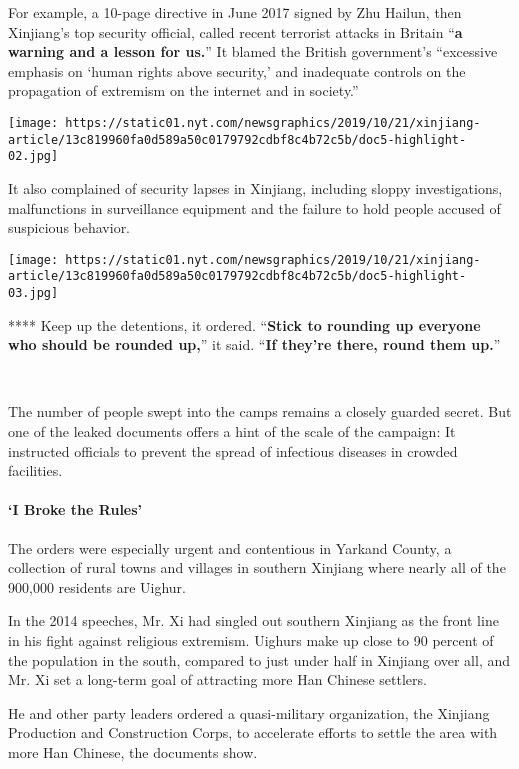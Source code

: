 For example, a 10-page directive in June 2017 signed by Zhu Hailun, then
Xinjiang's top security official, called recent terrorist attacks in
Britain ``\textbf{a warning and a lesson for us.}'' It blamed the
British government's ``excessive emphasis on `human rights above
security,' and inadequate controls on the propagation of extremism on
the internet and in society.''

\texttt{[image: https://static01.nyt.com/newsgraphics/2019/10/21/xinjiang-article/13c819960fa0d589a50c0179792cdbf8c4b72c5b/doc5-highlight-02.jpg]}

It also complained of security lapses in Xinjiang, including sloppy
investigations, malfunctions in surveillance equipment and the failure
to hold people accused of suspicious behavior.

\texttt{[image: https://static01.nyt.com/newsgraphics/2019/10/21/xinjiang-article/13c819960fa0d589a50c0179792cdbf8c4b72c5b/doc5-highlight-03.jpg]}

 **** Keep up the detentions, it ordered. ``\textbf{Stick to rounding up
everyone who should be rounded up,}'' it said. ``\textbf{If they're
there, round them up.}''

​

The number of people swept into the camps remains a closely guarded
secret. But one of the leaked documents offers a hint of the scale of
the campaign: It instructed officials to prevent the spread of
infectious diseases in crowded facilities.

\hypertarget{-i-broke-the-rules-}{%
\paragraph{ `I Broke the Rules' }\label{-i-broke-the-rules-}}

The orders were especially urgent and contentious in Yarkand County, a
collection of rural towns and villages in southern Xinjiang where nearly
all of the 900,000 residents are Uighur.

In the 2014 speeches, Mr. Xi had singled out southern Xinjiang as the
front line in his fight against religious extremism. Uighurs make up
close to 90 percent of the population in the south, compared to just
under half in Xinjiang over all, and Mr. Xi set a long-term goal of
attracting more Han Chinese settlers.

He and other party leaders ordered a quasi-military organization, the
Xinjiang Production and Construction Corps, to accelerate efforts to
settle the area with more Han Chinese, the documents show.

